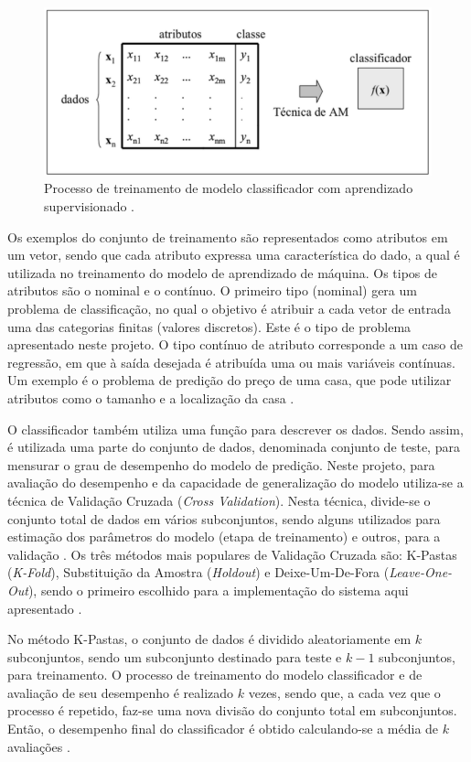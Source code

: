 \begin{figure}[H]
 \centering
  \includegraphics[width=0.8\linewidth]{figuras/supervisedLearning.pdf}
  \caption{Processo de treinamento de modelo classificador com aprendizado supervisionado .}
  \label{fig:supervised}
\end{figure}

Os exemplos do conjunto de treinamento são representados como atributos em um vetor, sendo que cada atributo expressa uma característica do dado, a qual é utilizada no treinamento do modelo de aprendizado de máquina. Os tipos de atributos são o nominal e o contínuo. O primeiro tipo (nominal) gera um problema de classificação, no qual o objetivo é atribuir a cada vetor de entrada uma das categorias finitas (valores discretos). Este é o tipo de problema apresentado neste projeto. O tipo contínuo de atributo corresponde a um caso de regressão, em que à saída desejada é atribuída uma ou mais variáveis contínuas. Um exemplo é o problema de predição do preço de uma casa, que pode utilizar atributos como o tamanho e a localização da casa .

O classificador também utiliza uma função para descrever os dados. Sendo assim, é utilizada uma parte do conjunto de dados, denominada conjunto de teste, para mensurar o grau de desempenho do modelo de predição. Neste projeto, para avaliação do desempenho e da capacidade de generalização do modelo utiliza-se a técnica de Validação Cruzada (\textit{Cross Validation}). Nesta técnica, divide-se o conjunto total de dados em vários subconjuntos, sendo alguns utilizados para estimação dos parâmetros do modelo (etapa de treinamento) e outros, para a validação . Os três métodos mais populares de Validação Cruzada são: K-Pastas (\textit{K-Fold}), Substituição da Amostra (\textit{Holdout}) e Deixe-Um-De-Fora (\textit{Leave-One-Out}), sendo o primeiro escolhido para a implementação do sistema aqui apresentado .

No método K-Pastas, o conjunto de dados é dividido aleatoriamente em $k$ subconjuntos, sendo um subconjunto destinado para teste e $k-1$ subconjuntos, para treinamento. O processo de treinamento do modelo classificador e de avaliação de seu desempenho é realizado $k$ vezes, sendo que, a cada vez que o processo é repetido, faz-se uma nova divisão do conjunto total em subconjuntos. Então, o desempenho final do classificador é obtido calculando-se a média de $k$ avaliações .

